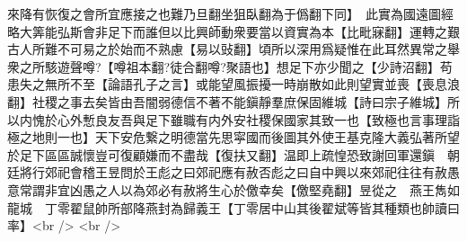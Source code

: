 來降有恢復之會所宜應接之也難乃旦翻坐狙臥翻為于僞翻下同】　此實為國遠圖經略大筭能弘斯會非足下而誰但以比興師動衆要當以資實為本【比毗寐翻】運轉之艱古人所難不可易之於始而不熟慮【易以䜴翻】頃所以深用爲疑惟在此耳然異常之舉衆之所駭遊聲噂?【噂祖本翻?徒合翻噂?聚語也】想足下亦少聞之【少詩沼翻】苟患失之無所不至【論語孔子之言】或能望風振擾一時崩散如此則望實並喪【喪息浪翻】社稷之事去矣皆由吾闇弱德信不著不能鎭靜羣庶保固維城【詩曰宗子維城】所以内愧於心外慙良友吾與足下雖職有内外安社稷保國家其致一也【致極也言事理詣極之地則一也】天下安危繋之明德當先思寜國而後圖其外使王基克隆大義弘著所望於足下區區誠懷豈可復顧嫌而不盡哉【復扶又翻】温即上疏惶恐致謝回軍還鎭　朝廷將行郊祀會稽王昱問於王彪之曰郊祀應有赦否彪之曰自中興以來郊祀往往有赦愚意常謂非宜凶愚之人以為郊必有赦將生心於儌幸矣【儌堅堯翻】昱從之　燕王雋如龍城　丁零翟鼠帥所部降燕封為歸義王【丁零居中山其後翟斌等皆其種類也帥讀曰率】<br />
<br />
